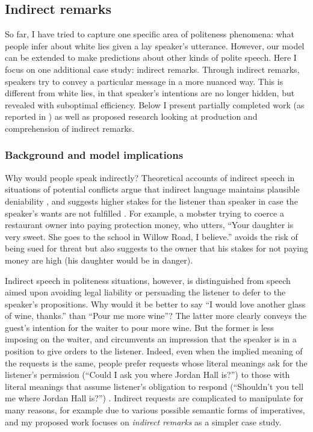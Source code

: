 \subsection{Indirect remarks}
\label{sec:other}

So far, I have tried to capture one specific area of politeness phenomena: what people infer about white lies given a lay speaker's utterance. However, our model can be extended to make predictions about other kinds of polite speech. Here I focus on one additional case study: indirect remarks. Through indirect remarks, speakers try to convey a particular message in a more nuanced way. This is different from white lies, in that speaker's intentions are no longer hidden, but revealed with suboptimal efficiency. Below I present partially completed work (as reported in \citet{yoon2017}) as well as proposed research looking at production and comprehension of indirect remarks.

\subsubsection{Background and model implications} Why would people speak indirectly? Theoretical accounts of indirect speech in situations of potential conflicts argue that indirect language maintains plausible deniability \citep{pinker2008}, and suggests higher stakes for the listener than speaker in case the speaker's wants are not fulfilled \citep{franke2016}. For example, a mobster trying to coerce a restaurant owner into paying protection money, who utters, ``Your daughter is very sweet. She goes to the school in Willow Road, I believe.'' avoids the risk of being sued for threat but also suggests to the owner that his stakes for not paying money are high (his daughter would be in danger). 

Indirect speech in politeness situations, however, is distinguished from speech aimed upon avoiding legal liability or persuading the listener to defer to the speaker's propositions. Why would it be better to say ``I would love another glass of wine, thanks.'' than ``Pour me more wine''? The latter more clearly conveys the guest's intention for the waiter to pour more wine. But the former is less imposing on the waiter, and circumvents an impression that the speaker is in a position to give orders to the listener. Indeed, even when the implied meaning of the requests is the same, people prefer requests whose literal meanings ask for the listener's permission (``Could I ask you where Jordan Hall is?'') to those with literal meanings that assume listener's obligation to respond (``Shouldn't you tell me where Jordan Hall is?'') \citep{clark1980}. Indirect requests are complicated to manipulate for many reasons, for example due to various possible semantic forms of imperatives, and my proposed work focuses on \emph{indirect remarks} as a simpler case study.

